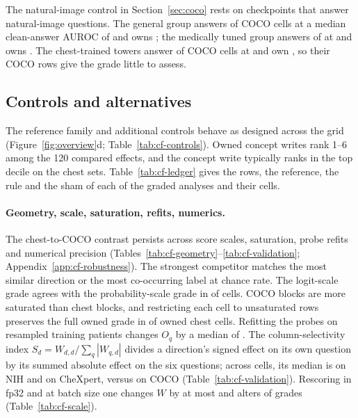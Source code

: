 \documentclass{article}
\begin{document}
The natural-image control in Section~\ref{sec:coco} rests on checkpoints that answer natural-image questions. The general group answers \cfSpecGenCocoAnswerable{} of \cfSpecGenCocoN{} COCO cells at a median clean-answer AUROC of \cfSpecGenCocoAnsAuroc{} and owns \cfSpecGenCocoOwned{}; the medically tuned group answers \cfSpecMedCocoAnswerable{} of \cfSpecMedCocoN{} at \cfSpecMedCocoAnsAuroc{} and owns \cfSpecMedCocoOwned{}. The chest-trained towers answer \cfSpecTowerCocoAnswerable{} of \cfSpecTowerCocoN{} COCO cells at \cfSpecTowerCocoAnsAuroc{} and own \cfSpecTowerCocoOwned{}, so their COCO rows give the grade little to assess.

\subsection{Controls and alternatives}
\label{sec:controls}

The reference family and additional controls behave as designed across the grid (Figure~\ref{fig:overview}d; Table~\ref{tab:cf-controls}). Owned concept writes rank 1--6 among the 120 compared effects, and the concept write typically ranks in the top decile on the chest sets. Table~\ref{tab:cf-ledger} gives the rows, the reference, the rule and the sham of each of the \cfLedgerAnalyses{} graded analyses and their \cfLedgerCells{} cells.

\label{sec:robust-geometry}

\paragraph{Geometry, scale, saturation, refits, numerics.} The chest-to-COCO contrast persists across score scales, saturation, probe refits and numerical precision (Tables~\ref{tab:cf-geometry}--\ref{tab:cf-validation}; Appendix~\ref{app:cf-robustness}). The strongest competitor matches the most similar direction or the most co-occurring label at chance rate. The logit-scale grade agrees with the probability-scale grade in \cfScaleAgree{} of \cfScaleAgreeN{} cells. COCO blocks are more saturated than chest blocks, and restricting each cell to unsaturated rows preserves the full owned grade in \cfScaleUnsatGradeKept{} of \cfScaleUnsatGradeN{} owned chest cells. Refitting the probes on resampled training patients changes $O_q$ by a median of \cfScaleRefitMedian{}. The column-selectivity index $S_d=W_{d,d}/\sum_q|W_{q,d}|$ divides a direction's signed effect on its own question by its summed absolute effect on the six questions; across cells, its median is \cfValColSelNih{} on NIH and \cfValColSelChex{} on CheXpert, versus \cfValColSelCoco{} on COCO (Table~\ref{tab:cf-validation}). Rescoring in fp32 and at batch size one changes $W$ by at most \cfPrecisionMaxDW{} and alters \cfPrecisionGradeChanges{} of \cfPrecisionGradeCells{} grades (Table~\ref{tab:cf-scale}).
\end{document}
